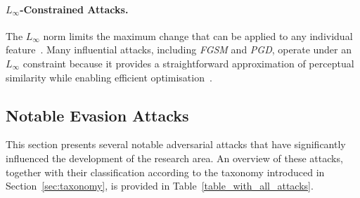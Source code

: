 \documentclass[review]{AIM_report}
\begin{document}
\paragraph{$L_\infty$-Constrained Attacks.}
The $L_\infty$ norm limits the maximum change that can be applied to any individual feature~\cite{costa2024deep, liang2022adversarial}. Many influential attacks, including \textit{FGSM} and \textit{PGD}, operate under an $L_\infty$ constraint because it provides a straightforward approximation of perceptual similarity while enabling efficient optimisation~\cite{goodfellow2014explaining,madry2017towards}.

\subsection{Notable Evasion Attacks}
This section presents several notable adversarial attacks that have significantly influenced the development of the research area. An overview of these attacks, together with their classification according to the taxonomy introduced in Section~\ref{sec:taxonomy}, is provided in Table~\ref{table_with_all_attacks}. %
\end{document}
